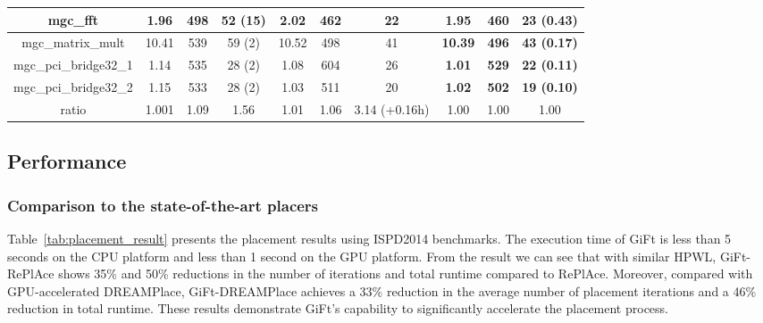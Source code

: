 \begin{table*}[]
\begin{tabular}{|c||ccc|ccc|ccc|}
mgc\_fft              & \multicolumn{1}{c|}{1.96}           & \multicolumn{1}{c|}{498}       & 52 (15) & \multicolumn{1}{c|}{2.02}  & \multicolumn{1}{c|}{462}       & 22            & \multicolumn{1}{c|}{\textbf{1.95}}  & \multicolumn{1}{c|}{\textbf{460}} & \textbf{23 (0.43)} \\ \hline
mgc\_matrix\_mult     & \multicolumn{1}{c|}{10.41}          & \multicolumn{1}{c|}{539}       & 59 (2)  & \multicolumn{1}{c|}{10.52} & \multicolumn{1}{c|}{498}       & 41            & \multicolumn{1}{c|}{\textbf{10.39}} & \multicolumn{1}{c|}{\textbf{496}} & \textbf{43 (0.17)} \\ \hline
mgc\_pci\_bridge32\_1 & \multicolumn{1}{c|}{1.14}           & \multicolumn{1}{c|}{535}       & 28 (2)  & \multicolumn{1}{c|}{1.08}  & \multicolumn{1}{c|}{604}       & 26            & \multicolumn{1}{c|}{\textbf{1.01}}  & \multicolumn{1}{c|}{\textbf{529}} & \textbf{22 (0.11)} \\ \hline
mgc\_pci\_bridge32\_2 & \multicolumn{1}{c|}{1.15}           & \multicolumn{1}{c|}{533}       & 28 (2)  & \multicolumn{1}{c|}{1.03}  & \multicolumn{1}{c|}{511}       & 20            & \multicolumn{1}{c|}{\textbf{1.02}}  & \multicolumn{1}{c|}{\textbf{502}} & \textbf{19 (0.10)} \\ \hline
ratio                 & \multicolumn{1}{c|}{1.001}          & \multicolumn{1}{c|}{1.09}      & 1.56    & \multicolumn{1}{c|}{1.01}  & \multicolumn{1}{c|}{1.06}      & 3.14 (+0.16h) & \multicolumn{1}{c|}{1.00}           & \multicolumn{1}{c|}{1.00}         & 1.00               \\ \hline
                          
\end{tabular}
\vspace{-1em}
\end{table*}


\subsection{Performance}




\subsubsection{Comparison to the state-of-the-art placers}
Table~\ref{tab:placement_result} presents the placement results using ISPD2014 benchmarks.
The execution time of GiFt is less than 5 seconds on the CPU platform and less than 1 second on the GPU platform. 
From the result we can see that with similar HPWL, GiFt-RePlAce shows 35\% and 50\% reductions in the number of iterations and total runtime compared to RePlAce. Moreover, compared with GPU-accelerated DREAMPlace, GiFt-DREAMPlace achieves a 33\% reduction in the average number of placement iterations and a 46\% reduction in total runtime.
These results demonstrate GiFt's capability to significantly accelerate the placement process. 
 

